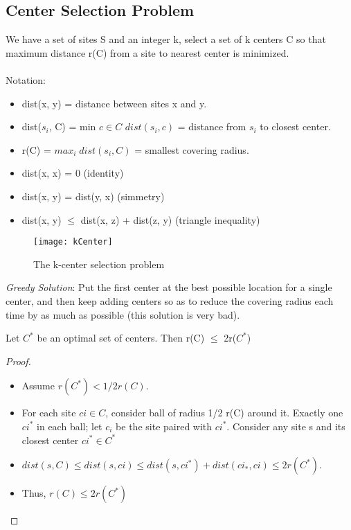 \subsection{Center Selection Problem}
We have a set of sites S and an integer k, select a set of k centers C so that maximum distance r(C) from a site to nearest center is minimized.\\\\
Notation:
\begin{itemize}
    \item{dist(x, y) = distance between sites x and y.}
    \item{dist($s_{i}$, C) = min $c \in C$ $dist(s_{i}, c)$ = distance from $s_{i}$ to closest center.}
    \item{r(C) = $max_{i} \; dist(s_{i}, C)$ = smallest covering radius.}
    \item{dist(x, x) = 0 (identity)}
    \item{dist(x, y) = dist(y, x) (simmetry)}
    \item{dist(x, y) $\leq$ dist(x, z) + dist(z, y) (triangle inequality)}

\end{itemize}

\begin{figure}[H]
    \centering
    \texttt{[image: kCenter]}
    \caption{The k-center selection problem}
\end{figure}

\emph{Greedy Solution}: Put the first center at the best possible location for a single center, and then keep adding centers so as to reduce the covering radius each time by as much as possible (this solution is very bad).\\

\begin{claim}
    Let $C^{*}$ be an optimal set of centers. Then r(C) $\leq$ 2r($C^{*}$)
\end{claim}

\begin{proof}
    \begin{itemize}
        \item{Assume $r(C^{*}) < 1/2 r(C)$}.
        \item{For each site $ci \in C$, consider ball of radius 1/2 r(C) around it. Exactly one $ci^{*}$ in each ball; let $c_{i}$ be the site paired with $ci^{*}$. Consider any site s and its closest center $ci^{*} ∈ C^{*}$}
        \item{$dist(s, C) \leq dist(s, ci) \leq dist(s, ci^{*}) + dist(ci_{*}, ci) \leq 2r(C^{*}).$}
        \item{Thus, $r(C) \leq 2r(C^{*})$}
    \end{itemize}
\end{proof}

